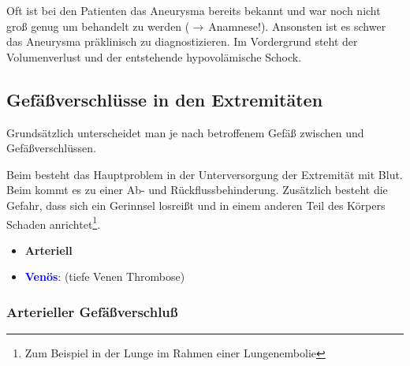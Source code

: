 


Oft ist bei den Patienten das Aneurysma bereits bekannt und
war noch nicht groß genug um behandelt zu werden
(${\rightarrow}$\,Anamnese!). Ansonsten ist es schwer das
Aneurysma präklinisch zu diagnostizieren. Im Vordergrund
steht der Volumenverlust und der entstehende hypovolämische
Schock. 


\subsection{Gefäßverschlüsse in den Extremitäten}

{
Grundsätzlich unterscheidet man je nach betroffenem Gefäß
zwischen  und 
Gefäßverschlüssen. 

Beim  besteht
das Hauptproblem in der Unterversorgung der Extremität mit
Blut. Beim  kommt es zu einer Ab- und
Rückflussbehinderung. Zusätzlich besteht die Gefahr, dass sich
ein Gerinnsel losreißt und in einem anderen Teil des
Körpers Schaden anrichtet\footnote{Zum Beispiel in der
Lunge im Rahmen einer Lungenembolie}.
}{
\begin{itemize}
  \item \textbf{\textcolor[rgb]{0.7882353,0.0,0.08627451}{Arteriell}}
  \item \textbf{\textcolor{blue}{Venös}}:
   (tiefe Venen Thrombose)
\end{itemize}
}{}{}{}



\subsubsection{Arterieller Gefäßverschluß}

